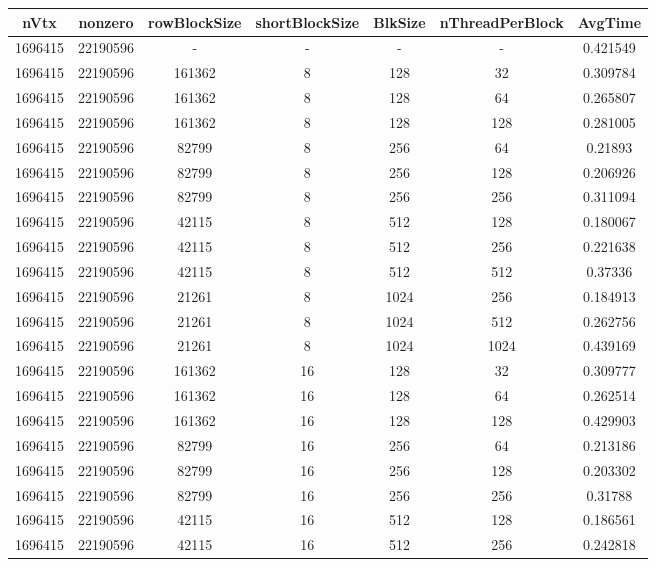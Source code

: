 \documentclass[9pt]{article}
\begin{document}
\SetBgPosition{0.25cm,-5.0cm}
\begin{tabular}{|c|c|c|c|c|c|c| }  
\hline
nVtx  & nonzero  & rowBlockSize  & shortBlockSize  & BlkSize  & nThreadPerBlock  & AvgTime \\
\hline
1696415  & 22190596  &  -  & -  & -  & -  &0.421549 \\
\hline
1696415  & 22190596  & 161362  & 8  & 128  & 32  & 0.309784 \\
\hline
1696415  & 22190596  & 161362  & 8  & 128  & 64  & 0.265807 \\
\hline
1696415  & 22190596  & 161362  & 8  & 128  & 128  & 0.281005 \\
\hline
1696415  & 22190596  & 82799  & 8  & 256  & 64  & 0.21893 \\
\hline
1696415  & 22190596  & 82799  & 8  & 256  & 128  & 0.206926 \\
\hline
1696415  & 22190596  & 82799  & 8  & 256  & 256  & 0.311094 \\
\hline
1696415  & 22190596  & 42115  & 8  & 512  & 128  & 0.180067 \\
\hline
1696415  & 22190596  & 42115  & 8  & 512  & 256  & 0.221638 \\
\hline
1696415  & 22190596  & 42115  & 8  & 512  & 512  & 0.37336 \\
\hline
1696415  & 22190596  & 21261  & 8  & 1024  & 256  & 0.184913 \\
\hline
1696415  & 22190596  & 21261  & 8  & 1024  & 512  & 0.262756 \\
\hline
1696415  & 22190596  & 21261  & 8  & 1024  & 1024  & 0.439169 \\
\hline
1696415  & 22190596  & 161362  & 16  & 128  & 32  & 0.309777 \\
\hline
1696415  & 22190596  & 161362  & 16  & 128  & 64  & 0.262514 \\
\hline
1696415  & 22190596  & 161362  & 16  & 128  & 128  & 0.429903 \\
\hline
1696415  & 22190596  & 82799  & 16  & 256  & 64  & 0.213186 \\
\hline
1696415  & 22190596  & 82799  & 16  & 256  & 128  & 0.203302 \\
\hline
1696415  & 22190596  & 82799  & 16  & 256  & 256  & 0.31788 \\
\hline
1696415  & 22190596  & 42115  & 16  & 512  & 128  & 0.186561 \\
\hline
1696415  & 22190596  & 42115  & 16  & 512  & 256  & 0.242818 \\

\end{tabular}
\end{document}
